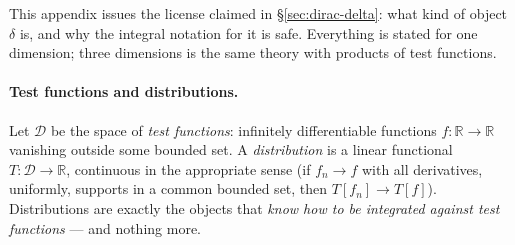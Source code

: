 \documentclass[11pt]{article}
\theoremstyle{plain}
\theoremstyle{definition}
\theoremstyle{remark}
\newcommand{\R}{\mathbb{R}}
\begin{document}
This appendix issues the license claimed in \S\ref{sec:dirac-delta}:
what kind of object $\delta$ is, and why the integral notation for it
is safe. Everything is stated for one dimension; three dimensions is
the same theory with products of test functions.

\paragraph{Test functions and distributions.} Let $\mathcal D$ be the
space of \emph{test functions}: infinitely differentiable functions
$f: \R \to \R$ vanishing outside some bounded set. A
\emph{distribution} is a linear functional $T: \mathcal D \to \R$,
continuous in the appropriate sense (if $f_n \to f$ with all
derivatives, uniformly, supports in a common bounded set, then
$T[f_n] \to T[f]$). Distributions are exactly the objects that
\emph{know how to be integrated against test functions} --- and
nothing more.
\end{document}
